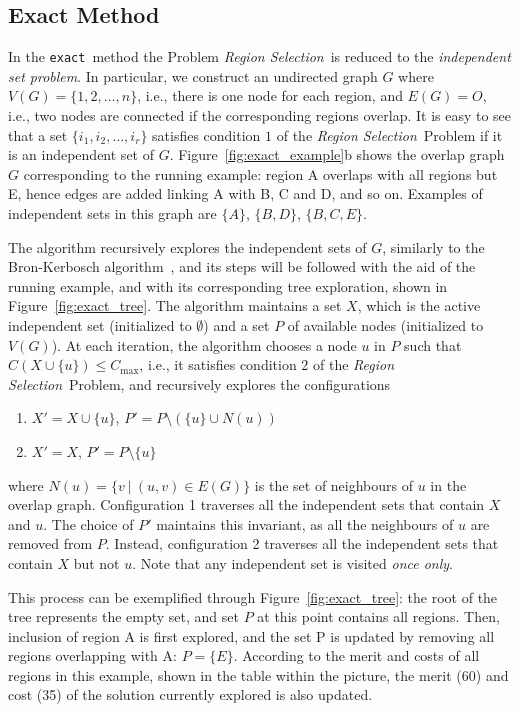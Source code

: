 \documentclass[]{usiinfthesis}
\newcommand{\exact}{\texttt{exact}}
\newcommand{\rsprobname}{\emph{Region Selection}}
\begin{document}
\subsection{Exact Method}
\label{sec:algo-exact}

In the \exact\ method the Problem \rsprobname\ is reduced to the
\emph{independent set problem}. In particular, we construct an
undirected graph $G$ where $V(G) = \{ 1, 2, \ldots, n \}$, i.e., there
is one node for each region, and $E(G) = O$, i.e., two nodes are
connected if the corresponding regions overlap. It is easy to see that
a set $\{ i_1, i_2, \ldots, i_r \}$ satisfies condition $1$ of the
\rsprobname\ Problem if it is an independent set of $G$.
Figure~\ref{fig:exact_example}b shows the overlap graph $G$
corresponding to the running example: region A overlaps with all
regions but E, hence edges are added linking A with B, C and D, and so
on. Examples of independent sets in this graph are $\{A\}$, $\{B,D\}$,
$\{B,C,E\}$.\par

The algorithm recursively explores the independent sets of $G$,
similarly to the Bron-Kerbosch algorithm~\cite{BronKerbosch73}, and
its steps will be followed with the aid of the running example, and
with its corresponding tree exploration, shown in
Figure~\ref{fig:exact_tree}. The algorithm maintains a set $X$, which
is the active independent set (initialized to $\emptyset$) and a set
$P$ of available nodes (initialized to $V(G)$). At each iteration, the
algorithm chooses a node $u$ in $P$ such that $C(X\cup \{u\})\le
C_{\max}$, i.e., it satisfies condition $2$ of the \rsprobname\ Problem,
and recursively explores the configurations
\begin{enumerate}
\item $X' = X\cup \{u\}$, $P' = P\setminus (\{u\}\cup N(u))$
\item $X' = X$, $P' = P\setminus \{u\}$
\end{enumerate}

where $N(u) = \{ v\ |\ (u,v)\in E(G) \}$ is the set of neighbours of
$u$ in the overlap graph.
Configuration 1 traverses all the independent sets that contain $X$
and $u$. The choice of $P'$ maintains this invariant, as all the
neighbours of $u$ are removed from $P$. Instead, configuration 2
traverses all the independent sets that contain $X$ but not $u$. Note
that any independent set is visited \emph{once only}.

This process can be exemplified through Figure~\ref{fig:exact_tree}:
the root of the tree represents the empty set, and set $P$ at this
point contains all regions. Then, inclusion of region A is first
explored, and the set P is updated by removing all regions overlapping
with A: $P = \{E\}$. According to the merit and costs of all regions
in this example, shown in the table within the picture, the merit (60)
and cost (35) of the solution currently explored is also updated.
\end{document}
